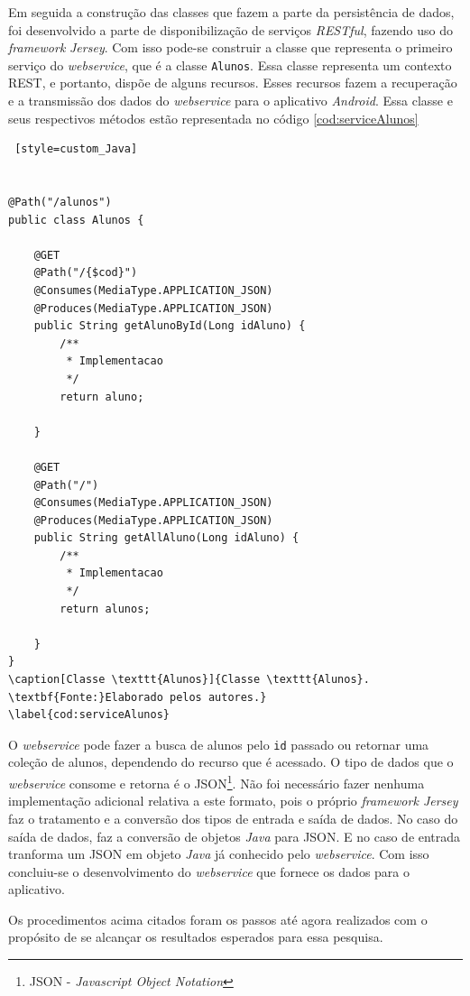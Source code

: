 	\par Em seguida a construção das classes que fazem a parte da persistência de
dados, foi desenvolvido a parte de disponibilização de serviços
\textit{RESTful}, fazendo uso do \textit{framework} \textit{Jersey}. Com isso
pode-se construir a classe que representa o primeiro serviço do
\textit{webservice}, que é a classe \texttt{Alunos}. Essa classe representa um
contexto REST, e portanto, dispõe de alguns recursos. Esses recursos fazem a
recuperação e a transmissão dos dados do \textit{webservice} para o aplicativo
\textit{Android}. Essa classe e seus respectivos métodos  estão representada no
código \ref{cod:serviceAlunos}

		\begin{lstlisting} [style=custom_Java] 


@Path("/alunos")
public class Alunos {

	@GET
	@Path("/{$cod}")
	@Consumes(MediaType.APPLICATION_JSON)
	@Produces(MediaType.APPLICATION_JSON)
	public String getAlunoById(Long idAluno) {
		/**
		 * Implementacao
		 */
		return aluno;

	}
	
	@GET
	@Path("/")
	@Consumes(MediaType.APPLICATION_JSON)
	@Produces(MediaType.APPLICATION_JSON)
	public String getAllAluno(Long idAluno) {
		/**
		 * Implementacao
		 */
		return alunos;

	}
}
\caption[Classe \texttt{Alunos}]{Classe \texttt{Alunos}. \textbf{Fonte:}Elaborado pelos autores.}
\label{cod:serviceAlunos}
	\end{lstlisting} 
		
		\par O \textit{webservice} pode fazer a busca de alunos pelo \texttt{id}
passado ou retornar uma coleção de alunos, dependendo do recurso que é
acessado. O tipo de dados que o \textit{webservice} consome e retorna é o
JSON\footnote{JSON - \textit{Javascript Object Notation}}. Não foi necessário
fazer nenhuma implementação adicional relativa a este formato, pois o próprio
\textit{framework Jersey} faz o tratamento e a conversão dos tipos de entrada e
saída de dados. No caso do saída de dados, faz a conversão de objetos 
\textit{Java} para JSON. E no caso de entrada tranforma um JSON em objeto
\textit{Java} já conhecido pelo \textit{webservice}. Com isso concluiu-se o
desenvolvimento do \textit{webservice} que fornece os dados para o aplicativo.

	\par Os procedimentos acima citados foram os passos até agora realizados com o
propósito de se alcançar os resultados esperados para essa pesquisa.
		

